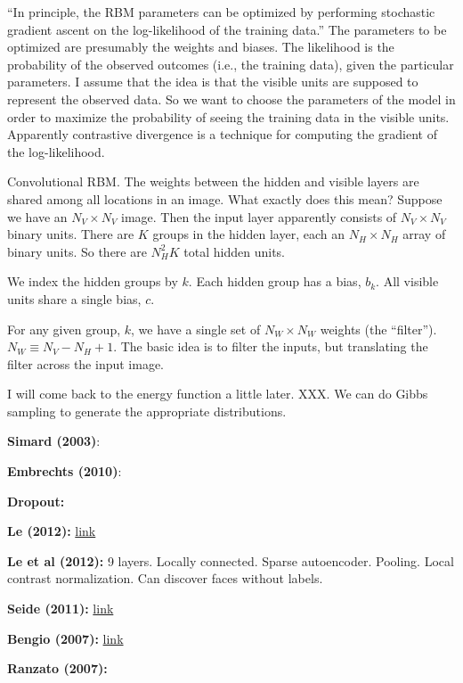 \documentclass[12pt]{article}
\newcommand{\link}[2]{\href{#1}{#2}}
\begin{document}
``In principle, the RBM parameters can be optimized by performing
stochastic gradient ascent on the log-likelihood of the training
data.''  The parameters to be optimized are presumably the weights and
biases.  The likelihood is the probability of the observed outcomes
(i.e., the training data), given the particular parameters.  I assume
that the idea is that the visible units are supposed to represent the
observed data.  So we want to choose the parameters of the model in
order to maximize the probability of seeing the training data in the
visible units.  Apparently contrastive divergence is a technique for
computing the gradient of the log-likelihood.

Convolutional RBM. The weights between the hidden and visible layers
are shared among all locations in an image.  What exactly does this
mean?  Suppose we have an $N_V \times N_V$ image.  Then the input
layer apparently consists of $N_V \times N_V$ binary units.  There are
$K$ groups in the hidden layer, each an $N_H \times N_H$ array of
binary units.  So there are $N_H^2 K$ total hidden units.

We index the hidden groups by $k$.  Each hidden group has a bias,
$b_k$.  All visible units share a single bias, $c$.

For any given group, $k$, we have a single set of $N_W \times N_W$
weights (the ``filter'').  $N_W \equiv N_V-N_H+1$.  The basic idea is
to filter the inputs, but translating the filter across the input
image.

I will come back to the energy function a little later.  XXX.  We can
do Gibbs sampling to generate the appropriate distributions.




\textbf{Simard (2003)}:

\textbf{Embrechts (2010)}:

\textbf{Dropout:}

\textbf{Le (2012):} \link{https://plus.google.com/u/0/+ResearchatGoogle/posts/EMyhnBetd2F}{link}

\textbf{Le et al (2012):} 9 layers.  Locally connected.  Sparse
autoencoder.  Pooling.  Local contrast normalization.  Can discover
faces without labels.

\textbf{Seide (2011):}
\link{http://research.microsoft.com/apps/pubs/default.aspx?id=153169}{link}

\textbf{Bengio (2007):} \link{http://arxiv.org/pdf/1206.5533v2.pdf}{link}

\textbf{Ranzato (2007):}
\end{document}
